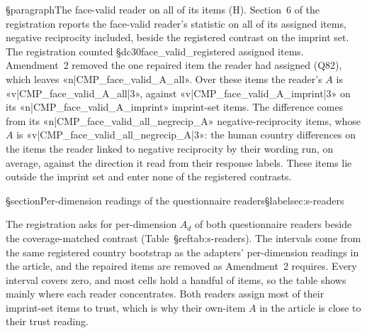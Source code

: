 §paragraph{The face-valid reader on all of its items (H).} Section~6 of the registration reports the face-valid reader's statistic on all of its assigned items, negative reciprocity included, beside the registered contrast on the imprint set. The registration counted §dc{30}{face_valid_registered} assigned items. Amendment~2 removed the one repaired item the reader had assigned (Q82), which leaves «n|CMP_face_valid_A_all». Over these items the reader's $A$ is «v|CMP_face_valid_A_all|3», against «v|CMP_face_valid_A_imprint|3» on its «n|CMP_face_valid_A_imprint» imprint-set items. The difference comes from its «n|CMP_face_valid_all_negrecip_A» negative-reciprocity items, whose $A$ is «v|CMP_face_valid_all_negrecip_A|3»: the human country differences on the items the reader linked to negative reciprocity by their wording run, on average, against the direction it read from their response labels. These items lie outside the imprint set and enter none of the registered contrasts.

§section{Per-dimension readings of the questionnaire readers}§label{sec:s-readers}

The registration asks for per-dimension $A_d$ of both questionnaire readers beside the coverage-matched contrast (Table~§ref{tab:s-readers}). The intervals come from the same registered country bootstrap as the adapters' per-dimension readings in the article, and the repaired items are removed as Amendment~2 requires. Every interval covers zero, and most cells hold a handful of items, so the table shows mainly where each reader concentrates. Both readers assign most of their imprint-set items to trust, which is why their own-item $A$ in the article is close to their trust reading.

